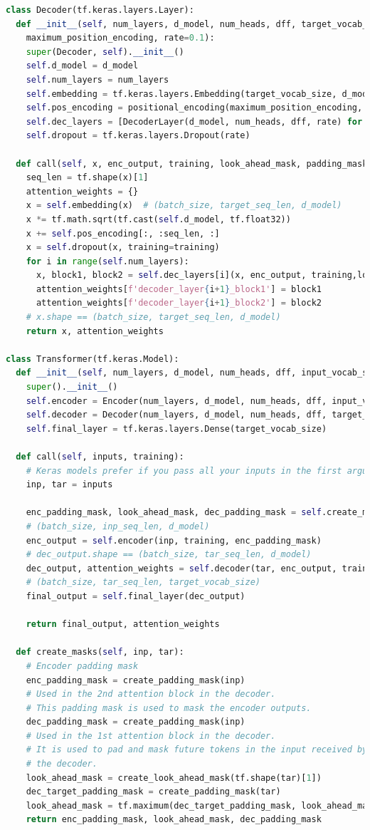 \begin{lstlisting}[language=Python, style=input]
class Decoder(tf.keras.layers.Layer):
  def __init__(self, num_layers, d_model, num_heads, dff, target_vocab_size,
    maximum_position_encoding, rate=0.1):
    super(Decoder, self).__init__()
    self.d_model = d_model
    self.num_layers = num_layers
    self.embedding = tf.keras.layers.Embedding(target_vocab_size, d_model)
    self.pos_encoding = positional_encoding(maximum_position_encoding, d_model)
    self.dec_layers = [DecoderLayer(d_model, num_heads, dff, rate) for _ in range(num_layers)]
    self.dropout = tf.keras.layers.Dropout(rate)

  def call(self, x, enc_output, training, look_ahead_mask, padding_mask):
    seq_len = tf.shape(x)[1]
    attention_weights = {}
    x = self.embedding(x)  # (batch_size, target_seq_len, d_model)
    x *= tf.math.sqrt(tf.cast(self.d_model, tf.float32))
    x += self.pos_encoding[:, :seq_len, :]
    x = self.dropout(x, training=training)
    for i in range(self.num_layers):
      x, block1, block2 = self.dec_layers[i](x, enc_output, training,look_ahead_mask, padding_mask)
      attention_weights[f'decoder_layer{i+1}_block1'] = block1
      attention_weights[f'decoder_layer{i+1}_block2'] = block2
    # x.shape == (batch_size, target_seq_len, d_model)
    return x, attention_weights

class Transformer(tf.keras.Model):
  def __init__(self, num_layers, d_model, num_heads, dff, input_vocab_size, target_vocab_size, pe_input, pe_target, rate=0.1):
    super().__init__()
    self.encoder = Encoder(num_layers, d_model, num_heads, dff, input_vocab_size, pe_input, rate)
    self.decoder = Decoder(num_layers, d_model, num_heads, dff, target_vocab_size, pe_target, rate)
    self.final_layer = tf.keras.layers.Dense(target_vocab_size)

  def call(self, inputs, training):
    # Keras models prefer if you pass all your inputs in the first argument
    inp, tar = inputs

    enc_padding_mask, look_ahead_mask, dec_padding_mask = self.create_masks(inp, tar)
    # (batch_size, inp_seq_len, d_model)
    enc_output = self.encoder(inp, training, enc_padding_mask)
    # dec_output.shape == (batch_size, tar_seq_len, d_model)
    dec_output, attention_weights = self.decoder(tar, enc_output, training, look_ahead_mask, dec_padding_mask)
    # (batch_size, tar_seq_len, target_vocab_size)
    final_output = self.final_layer(dec_output)

    return final_output, attention_weights

  def create_masks(self, inp, tar):
    # Encoder padding mask
    enc_padding_mask = create_padding_mask(inp)
    # Used in the 2nd attention block in the decoder.
    # This padding mask is used to mask the encoder outputs.
    dec_padding_mask = create_padding_mask(inp)
    # Used in the 1st attention block in the decoder.
    # It is used to pad and mask future tokens in the input received by
    # the decoder.
    look_ahead_mask = create_look_ahead_mask(tf.shape(tar)[1])
    dec_target_padding_mask = create_padding_mask(tar)
    look_ahead_mask = tf.maximum(dec_target_padding_mask, look_ahead_mask)
    return enc_padding_mask, look_ahead_mask, dec_padding_mask


\end{lstlisting}
